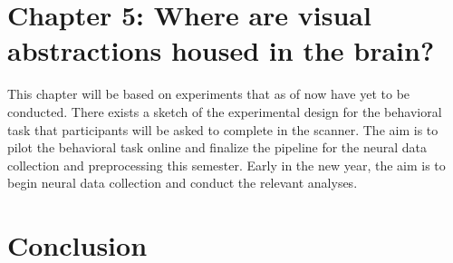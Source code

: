 \documentclass{Dissertate}
\begin{document}
\section*{Chapter 5: Where are visual abstractions housed in the brain?}

\begin{tcolorbox}[
    colback=gray!10,  %
    colframe=black!50, %
    arc=4mm,         %
    boxrule=2pt      %
]
This chapter will be based on experiments that as of now have yet to be conducted.
There exists a sketch of the experimental design for the behavioral task that participants will be asked to complete in the scanner. 
The aim is to pilot the behavioral task online and finalize the pipeline for the neural data collection and preprocessing this semester.
Early in the new year, the aim is to begin neural data collection and conduct the relevant analyses.
\end{tcolorbox}


\section*{Conclusion}





% 
\end{document}
